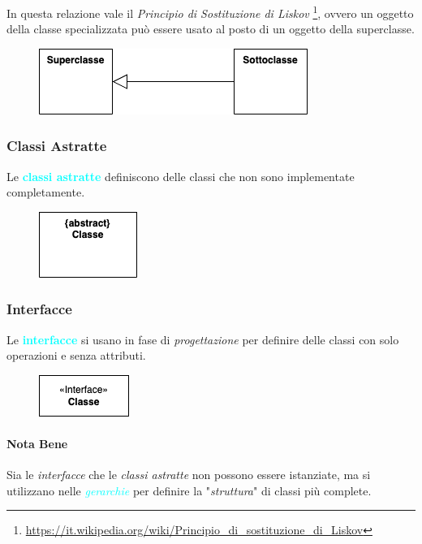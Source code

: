 In questa relazione vale il \emph{Principio di Sostituzione di Liskov} \footnote{\url{https://it.wikipedia.org/wiki/Principio_di_sostituzione_di_Liskov}},
ovvero un oggetto della classe specializzata può essere usato al posto di un oggetto della superclasse.

\begin{figure}[h]
    \centering
    \includegraphics[scale=0.7]{img/generalizzazione.png}
\end{figure}

\newpage
\subsubsection{Classi Astratte}
Le \textbf{\textcolor{cyan}{classi astratte}} definiscono delle classi che non sono implementate completamente.

\begin{figure}[h]
    \centering
    \includegraphics[scale=0.7]{img/abstract.png}
\end{figure}

\subsubsection{Interfacce}
Le \textbf{\textcolor{cyan}{interfacce}} si usano in fase di \emph{progettazione} per definire
delle classi con solo operazioni e senza attributi.

\begin{figure}[h]
    \centering
    \includegraphics[scale=0.7]{img/interface.png}
\end{figure}

\paragraph{Nota Bene} Sia le \emph{interfacce} che le \emph{classi astratte} non possono essere istanziate, ma si utilizzano
nelle \emph{\textcolor{cyan}{gerarchie}} per definire la "\emph{struttura}" di classi più complete.

